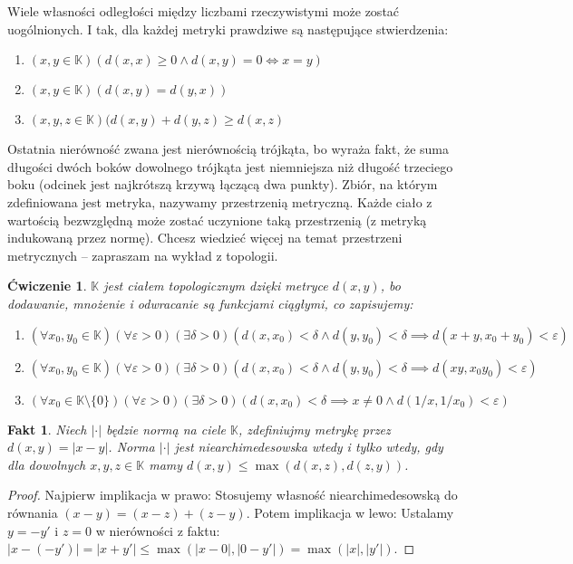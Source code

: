 \documentclass[a4paper,fleqn]{article}
\newtheorem{prb}[prbh]{\'Cwiczenie}
\newtheorem{fkt}{Fakt}
\newenvironment{enumx}{\begin{enumerate}
	\setlength{\itemsep}{0pt}
	\setlength{\parskip}{0pt}
	\setlength{\parsep}{0pt}}
{\end{enumerate}}
\begin{document}
\begin{multicols}{2}
Wiele własności odległości między liczbami rzeczywistymi może zostać uogólnionych. I tak, dla każdej metryki prawdziwe są następujące stwierdzenia:
\begin{enumx}
\item $(x,y \in \mathbb K) (d(x,x) \ge 0 \wedge d(x,y) = 0 \iff x = y)$
\item $(x,y \in \mathbb K) (d(x,y) = d(y,x))$
\item $(x,y,z \in \mathbb K) (d(x,y) + d(y,z) \ge d(x,z)$
\end{enumx}

Ostatnia nierówność zwana jest nierównością trójkąta, bo wyraża fakt, że suma długości dwóch boków dowolnego trójkąta jest niemniejsza niż długość trzeciego boku (odcinek jest najkrótszą krzywą łączącą dwa punkty). Zbiór, na którym zdefiniowana jest metryka, nazywamy przestrzenią metryczną. Każde ciało z wartością bezwzględną może zostać uczynione taką przestrzenią (z metryką indukowaną przez normę). Chcesz wiedzieć więcej na temat przestrzeni metrycznych -- zapraszam na wykład z topologii.

\begin{prb}$\mathbb K$ jest ciałem topologicznym dzięki metryce $d(x,y)$, bo dodawanie, mnożenie i odwracanie są funkcjami ciągłymi, co zapisujemy:
\begin{enumx}
\item $(\forall x_0, y_0 \in \mathbb K) (\forall \varepsilon > 0) (\exists \delta > 0)(d(x,x_0) < \delta \wedge d(y,y_0) < \delta \implies d(x+y,x_0+y_0) < \varepsilon)$
\item $(\forall x_0, y_0 \in \mathbb K) (\forall \varepsilon > 0) (\exists \delta > 0)(d(x,x_0) < \delta \wedge d(y,y_0) < \delta \implies d(xy,x_0y_0) < \varepsilon)$
\item $(\forall x_0 \in \mathbb K\setminus\{0\}) (\forall \varepsilon > 0) (\exists \delta > 0)(d(x,x_0) < \delta \implies x \neq 0 \wedge d(1/x, 1/x_0) < \varepsilon)$
\end{enumx}\end{prb}

\begin{fkt}Niech $|\cdot|$ będzie normą na ciele $\mathbb K$, zdefiniujmy metrykę przez $d(x,y) = |x-y|$. Norma $|\cdot|$ jest niearchimedesowska wtedy i tylko wtedy, gdy dla dowolnych $x,y,z\in\mathbb K$ mamy $d(x,y) \le \max(d(x,z), d(z,y))$.\end{fkt}

\begin{proof}Najpierw implikacja w prawo: Stosujemy własność niearchimedesowską do równania $(x-y) = (x-z) + (z-y)$. Potem implikacja w lewo: Ustalamy $y = -y'$ i $z=0$ w nierówności z faktu: $|x- (-y')| = |x+y'| \le \max (|x-0|, |0-y'|) = \max (|x|, |y'|)$.\end{proof}


\end{multicols}
\end{document}
